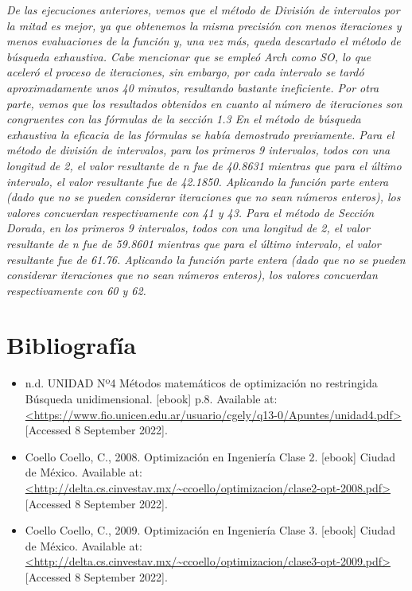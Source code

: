 \documentclass[12pt,oneside]{book}
\begin{document}
\textit{De las ejecuciones anteriores, vemos que el método de División de intervalos por la mitad es mejor, ya que obtenemos la misma precisión con menos iteraciones y menos evaluaciones de la función y, una vez más, queda descartado el método de búsqueda exhaustiva.
Cabe mencionar que se empleó Arch como SO, lo que aceleró el proceso de iteraciones, sin embargo, por cada intervalo se tardó aproximadamente unos 40 minutos, resultando bastante ineficiente.
Por otra parte, vemos que los resultados obtenidos en cuanto al número de iteraciones son congruentes con las fórmulas de la sección 1.3
En el método de búsqueda exhaustiva la eficacia de las fórmulas se había demostrado previamente. 
Para el método de división de intervalos, para los primeros 9 intervalos, todos con una longitud de 2, el valor resultante de n fue de 40.8631 mientras que para el último intervalo, el valor resultante fue de 42.1850. Aplicando la función parte entera (dado que no se pueden considerar iteraciones que no sean números enteros), los valores concuerdan respectivamente con 41 y 43.
Para el método de Sección Dorada, en los primeros 9 intervalos, todos con una longitud de 2, el valor resultante de n fue de 59.8601 mientras que para el último intervalo, el valor resultante fue de 61.76. Aplicando la función parte entera (dado que no se pueden considerar iteraciones que no sean números enteros), los valores concuerdan respectivamente con 60 y 62.}


\chapter{Bibliografía}

\begin{itemize}
    \item n.d. UNIDAD Nº4 Métodos matemáticos de optimización no restringida Búsqueda unidimensional. [ebook] p.8. Available at: \url{<https://www.fio.unicen.edu.ar/usuario/cgely/q13-0/Apuntes/unidad4.pdf>} [Accessed 8 September 2022].
    \item Coello Coello, C., 2008. Optimización en Ingeniería Clase 2. [ebook] Ciudad de México. Available at: \url{<http://delta.cs.cinvestav.mx/~ccoello/optimizacion/clase2-opt-2008.pdf>} [Accessed 8 September 2022].
    \item Coello Coello, C., 2009. Optimización en Ingeniería Clase 3. [ebook] Ciudad de México. Available at: \url{<http://delta.cs.cinvestav.mx/~ccoello/optimizacion/clase3-opt-2009.pdf>} [Accessed 8 September 2022].
\end{itemize}
\end{document}

